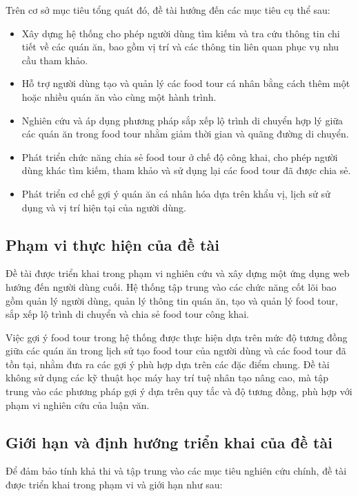 Trên cơ sở mục tiêu tổng quát đó, đề tài hướng đến các mục tiêu cụ thể sau:

\begin{itemize}[label=\textbullet]
    \item Xây dựng hệ thống cho phép người dùng tìm kiếm và tra cứu thông tin chi tiết về các quán ăn,
bao gồm vị trí và các thông tin liên quan phục vụ nhu cầu tham khảo.
    \item Hỗ trợ người dùng tạo và quản lý các food tour cá nhân bằng cách thêm một hoặc nhiều quán
ăn vào cùng một hành trình.
    \item Nghiên cứu và áp dụng phương pháp sắp xếp lộ trình di chuyển hợp lý giữa các quán ăn trong
food tour nhằm giảm thời gian và quãng đường di chuyển.
    \item Phát triển chức năng chia sẻ food tour ở chế độ công khai, cho phép người dùng khác tìm
kiếm, tham khảo và sử dụng lại các food tour đã được chia sẻ.
    \item Phát triển cơ chế gợi ý quán ăn cá nhân hóa dựa trên khẩu vị, lịch sử sử dụng và vị trí hiện tại của người dùng.
\end{itemize}

\subsection{Phạm vi thực hiện của đề tài}
Đề tài được triển khai trong phạm vi nghiên cứu và xây dựng một ứng dụng web hướng đến
người dùng cuối. Hệ thống tập trung vào các chức năng cốt lõi bao gồm quản lý người dùng,
quản lý thông tin quán ăn, tạo và quản lý food tour, sắp xếp lộ trình di chuyển và chia sẻ food
tour công khai.

Việc gợi ý food tour trong hệ thống được thực hiện dựa trên mức độ tương đồng giữa các quán
ăn trong lịch sử tạo food tour của người dùng và các food tour đã tồn tại, nhằm đưa ra các gợi ý
phù hợp dựa trên các đặc điểm chung. Đề tài không sử dụng các kỹ thuật học máy hay trí tuệ
nhân tạo nâng cao, mà tập trung vào các phương pháp gợi ý dựa trên quy tắc và độ tương đồng,
phù hợp với phạm vi nghiên cứu của luận văn.

\subsection{Giới hạn và định hướng triển khai của đề tài}
Để đảm bảo tính khả thi và tập trung vào các mục tiêu nghiên cứu chính, đề tài được triển khai
trong phạm vi và giới hạn như sau:

